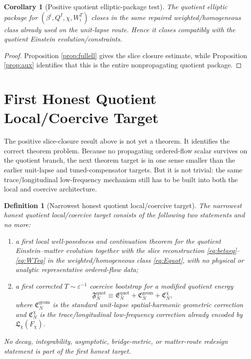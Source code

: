 \documentclass[11pt]{article}
\newtheorem{definition}{Definition}
\newtheorem{corollary}{Corollary}
\begin{document}
\begin{corollary}[Positive quotient elliptic-package test]
\label{cor:elliptic}
The quotient elliptic package for \((\beta^i,Q^I,\chi,W_i^T)\) closes in the same repaired weighted/homogeneous class already used on the unit-lapse route. Hence it closes compatibly with the quotient Einstein evolution/constraints.
\end{corollary}

\begin{proof}
Proposition \ref{prop:fullell} gives the slice closure estimate, while Proposition \ref{prop:aux} identifies that this is the entire nonpropagating quotient package.
\end{proof}

\section{First Honest Quotient Local/Coercive Target}

The positive slice-closure result above is not yet a theorem. It identifies the correct theorem problem. Because no propagating ordered-flow scalar survives on the quotient branch, the next theorem target is in one sense smaller than the earlier unit-lapse and tuned-compensator targets. But it is not trivial: the same trace/longitudinal low-frequency mechanism still has to be built into both the local and coercive architecture.

\begin{definition}[Narrowest honest quotient local/coercive target]
\label{def:target}
The \emph{narrowest honest quotient local/coercive target} consists of the following two statements and no more:
\begin{enumerate}
    \item a first local well-posedness and continuation theorem for the quotient Einstein--matter evolution together with the slice reconstruction \eqref{eq:betaeq}--\eqref{eq:WTeq} in the weighted/homogeneous class \eqref{eq:Equot}, with no physical or analytic representative ordered-flow data;
    \item a first corrected \(T\sim\varepsilon^{-1}\) coercive bootstrap for a modified quotient energy
    \begin{equation}
    \mathfrak F_N^{\mathrm{quot}}
    \equiv
    \mathfrak E_N^{\mathrm{quot}}
    +\mathfrak C_N^{\mathrm{geom}}
    +\mathfrak C_N^{\chi},
    \label{eq:Fquot}
    \end{equation}
    where \(\mathfrak C_N^{\mathrm{geom}}\) is the standard unit-lapse spatial-harmonic geometric correction and \(\mathfrak C_N^{\chi}\) is the trace/longitudinal low-frequency correction already encoded by \(\mathfrak L_\chi(F_\chi)\).
\end{enumerate}
No decay, integrability, asymptotic, bridge-metric, or matter-route redesign statement is part of the first honest target.
\end{definition}
\end{document}
